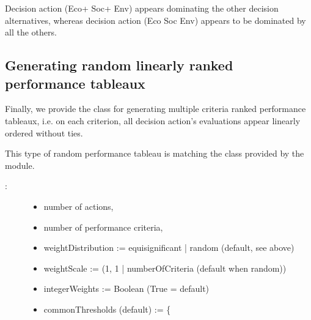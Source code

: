\documentclass[a4paper,12pt,english]{sphinxhowto}
\begin{document}
Decision action  (Eco+ Soc+ Env\sphinxhyphen{}) appears dominating the other decision alternatives, whereas decision action  (Eco\sphinxhyphen{} Soc\sphinxhyphen{} Env\sphinxhyphen{}) appears to be dominated by all the others.


\subsection{Generating random linearly ranked performance tableaux}
\label{\detokenize{tutorial:generating-random-linearly-ranked-performance-tableaux}}
Finally, we provide the  class for generating multiple criteria ranked performance tableaux, i.e. on each criterion, all decision action’s evaluations appear linearly ordered without ties.

This type of random performance tableau is matching the  class provided by the  module.
\begin{description}
\item[{:}] \leavevmode\begin{itemize}
\item {} 
number of actions,

\item {} 
number of performance criteria,

\item {} 
weightDistribution := equisignificant | random (default, see  above)

\item {} 
weightScale := (1, 1 | numberOfCriteria (default when random))

\item {} 
integerWeights := Boolean (True = default)

\item {} 
commonThresholds (default) := \{
\begin{quote}

\end{quote}

\end{itemize}

\end{description}
\end{document}
